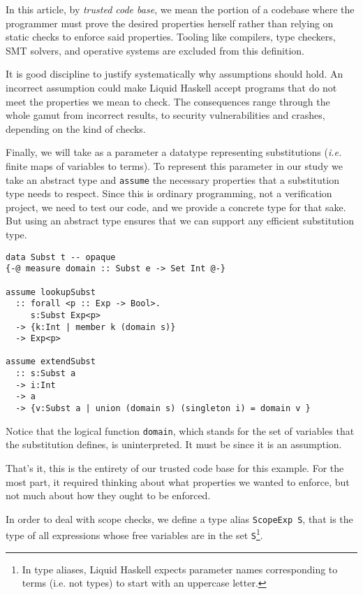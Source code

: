 \documentclass[sigconf]{acmart}
\newcommand{\tc}[1]{{\small\texttt{#1}}}
\begin{document}
In this article, by \emph{trusted code base}, we mean the portion of a
codebase where the programmer must prove the desired properties
herself rather than relying on static checks to enforce said properties.
Tooling like compilers, type checkers, SMT solvers, and operative systems
are excluded from this definition.

It is good discipline to justify systematically why assumptions should hold.
An incorrect assumption could make Liquid Haskell accept programs that do not
meet the properties we mean to check. The consequences range through the whole
gamut from incorrect results, to security vulnerabilities and crashes, depending
on the kind of checks.

Finally, we will take as a parameter a datatype representing substitutions
(\emph{i.e.} finite maps of variables to terms). To represent this parameter in
our study we take an abstract type and \tc{assume} the necessary properties that a
substitution type needs to respect. Since this is ordinary programming, not a
verification project, we need to test our code, and we provide a concrete type
for that sake. But using an abstract type ensures that we can support
any efficient substitution type.

\begin{verbatim}
data Subst t -- opaque
{-@ measure domain :: Subst e -> Set Int @-}

assume lookupSubst
  :: forall <p :: Exp -> Bool>.
     s:Subst Exp<p>
  -> {k:Int | member k (domain s)}
  -> Exp<p>

assume extendSubst
  :: s:Subst a
  -> i:Int
  -> a
  -> {v:Subst a | union (domain s) (singleton i) = domain v }
\end{verbatim}

Notice that the logical function \tc{domain}, which stands for the set of
variables that the substitution defines, is uninterpreted. It must be since it is an
assumption.

That's it, this is the entirety of our trusted code base for this example. For
the most part, it required thinking about what properties we wanted to enforce,
but not much about how they ought to be enforced.

In order to deal with scope checks, we define a type alias \tc{ScopeExp S},
that is the type of all
expressions whose free variables are in the set \tc{S}\footnote{In type aliases,
Liquid Haskell expects parameter names corresponding to terms (i.e. not types) to start with
an uppercase letter.}.
\end{document}
